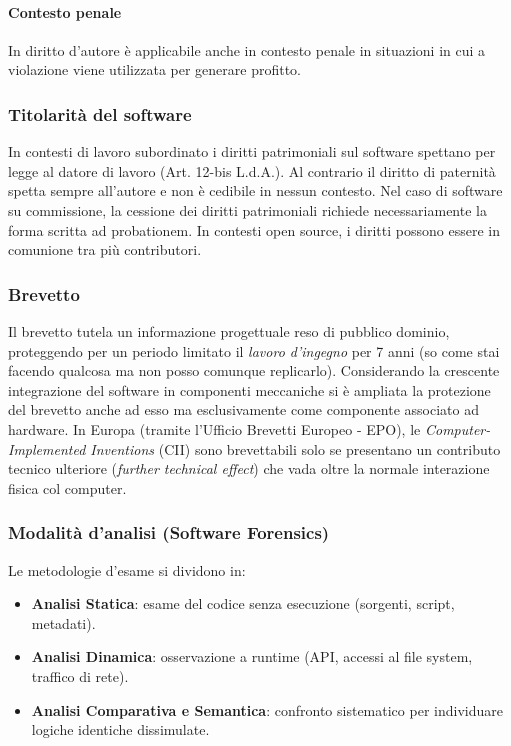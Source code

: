 \documentclass[11pt,a4paper]{article}
\begin{document}
\paragraph{Contesto penale}
In diritto d'autore è applicabile anche in contesto penale in situazioni in cui a violazione viene utilizzata per generare profitto. 

\subsubsection{Titolarità del software}
In contesti di lavoro subordinato i diritti patrimoniali sul software spettano per legge al datore di lavoro (Art. 12-bis L.d.A.). Al contrario il diritto di paternità spetta sempre all'autore e non è cedibile in nessun contesto. Nel caso di software su commissione, la cessione dei diritti patrimoniali richiede necessariamente la forma scritta ad probationem. In contesti open source, i diritti possono essere in comunione tra più contributori.

\subsubsection{Brevetto}
Il brevetto tutela un informazione progettuale reso di pubblico dominio, proteggendo per un periodo limitato il \textit{lavoro d'ingegno} per 7 anni (so come stai facendo qualcosa ma non posso comunque replicarlo). 
Considerando la crescente integrazione del software in componenti meccaniche si è ampliata la protezione del brevetto anche ad esso ma esclusivamente come componente associato ad hardware. In Europa (tramite l'Ufficio Brevetti Europeo - EPO), le \textit{Computer-Implemented Inventions} (CII) sono brevettabili solo se presentano un contributo tecnico ulteriore (\textit{further technical effect}) che vada oltre la normale interazione fisica col computer.

\subsubsection{Modalità d'analisi (Software Forensics)}
Le metodologie d'esame si dividono in:
\begin{itemize}
    \item \textbf{Analisi Statica}: esame del codice senza esecuzione (sorgenti, script, metadati).
    \item \textbf{Analisi Dinamica}: osservazione a runtime (API, accessi al file system, traffico di rete).
    \item \textbf{Analisi Comparativa e Semantica}: confronto sistematico per individuare logiche identiche dissimulate.
\end{itemize}
\end{document}
